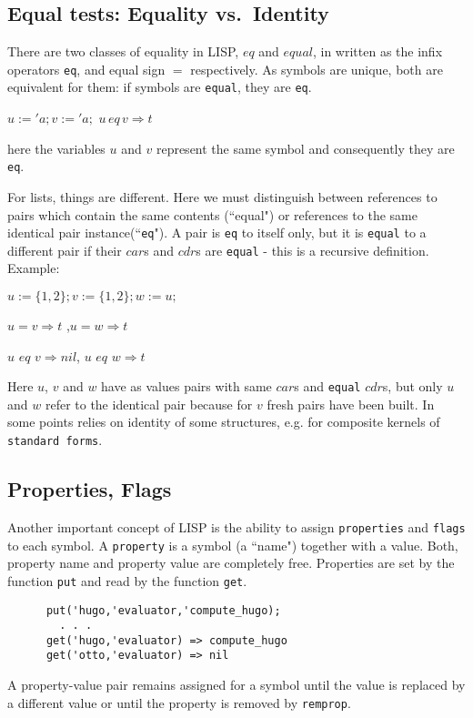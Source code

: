 \subsection{Equal tests: Equality vs.\  Identity}

There are two classes of equality in LISP, $eq$ and $equal$,
   \ttindex{=}
in {\reduce} written as the infix operators {\tt eq}, and   
equal sign $=$ respectively. As  symbols are unique,
both are equivalent for them: if symbols are {\tt equal}, 
they are {\tt eq}.

$u:='a; v:='a;$ $ u\, eq\, v \Rightarrow t$

\noindent
here the variables $u$ and $v$ represent the same symbol
and consequently they are {\tt eq}.

For lists, things are different. Here we must distinguish
between references to pairs which contain the same contents
(``equal") or references to the same identical pair
instance(``{\tt eq}").
A pair is {\tt eq}
to itself only, but it is {\tt equal} to a different pair if
their $car$s and $cdr$s are {\tt equal} - this is a
recursive definition. Example:
    
$u:=\{1,2\}; v:=\{1,2\};w:=u;$ 

$u=v \Rightarrow t$ ,$u=w \Rightarrow t$

 $u\,\,eq\,\,v\Rightarrow nil$, $u\,\,eq\,\,w\Rightarrow t$ 

Here $u$, $v$ and $w$ have as values pairs with same $car$s 
and {\tt equal} $cdr$s, but only $u$ and $w$ refer to
the identical pair because for $v$ fresh pairs have
been built. 
In some points {\reduce} relies on identity of some structures,
e.g. for composite kernels  of
{\tt standard forms}.

\subsection{Properties, Flags}

Another important concept of LISP is the ability to
assign {\tt properties} and 
{\tt flags} to each
symbol. A {\tt property} is a symbol (a ``name") together
with a value. Both, property name and property value are
completely free. Properties are set by the function {\tt put}
 and read by the function {\tt get}.
\begin{verbatim}
      put('hugo,'evaluator,'compute_hugo);
        . . .
      get('hugo,'evaluator) => compute_hugo
      get('otto,'evaluator) => nil
\end{verbatim}
A property-value pair remains assigned for a symbol until the value is 
replaced by a different value or until the property is removed
by {\tt remprop}.

